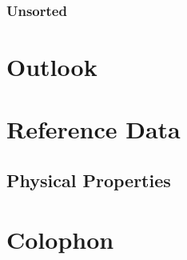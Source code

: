 \documentclass[a4paper,titlepage,onecolumn]{report}
\begin{document}
  \subsection{Unsorted}

\chapter{Outlook} \label{ch:outlook}

\chapter{Reference Data} \label{ch:reference}
\section{Physical Properties}
\label{ref:physicalproperties}
\chapter{Colophon}



\end{document}
